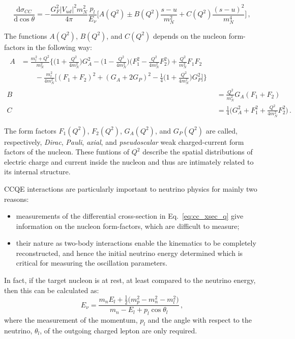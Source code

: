  \begin{equation}
   \label{eq:cc_xsec_t}
   \frac{\mathrm{d} \sigma_{CC}}{\mathrm{d}\cos\theta} = -\frac{G_F^2 |V_{ud}|^2 m_N^2}{4\pi} \frac{p_l}{E_\nu} %
   \bigg [A(Q^2) \pm B(Q^2) \frac{s-u}{m_N^2} + C(Q^2) \frac{(s-u)^2}{m_N^4} \bigg]\,,
 \end{equation}

 The functions $A(Q^2)$, $B(Q^2)$, and $C(Q^2)$ depends on the nucleon form-factors in the following way:
 \begin{align}
   \begin{split}
     \label{eq:A(Q)}
     A &= \frac{m_l^2+Q^2}{m_N^2} \bigg\{ \bigg(1+\frac{Q^2}{4m_N^2}\bigg) G_A^2 - \bigg(1-\frac{Q^2}{4m_N^2}\bigg) %
     \bigg(F_1^2 - \frac{Q^2}{4m_N^2}F_2^2 \bigg) +\frac{Q^2}{m_N^2} F_1 F_2 \\
       &\qquad- \frac{m_l^2}{4m_N^2} %
     \bigg[ (F_1+F_2)^2+(G_A+2G_P)^2-\frac{1}{4}\bigg(1+\frac{Q^2}{4m_N^2}\bigg) G_P^2 \bigg] \bigg\}\, 
   \end{split}\\
     \label{eq:B(Q)}
   B &= \frac{Q^2}{m_N^2} G_A (F_1+F_2)\,\\
     \label{eq:C(Q)}
   C &= \frac{1}{4} \big (G_A^2 +F_1^2+\frac{Q^2}{4m_N^2}F_2^2\big)\,.
 \end{align}

 The form factors $F_1(Q^2)$, $F_2(Q^2)$, $G_A(Q^2)$, and $G_P(Q^2)$ are called, respectively, \emph{Dirac}, %
 \emph{Pauli}, \emph{axial}, and \emph{pseudoscalar} weak charged-current form factors of the nucleon.
 These funtions of $Q^2$ describe the spatial distributions of electric charge and current inside the nucleon %
 and thus are intimately related to its internal structure.

 CCQE interactions are particularly important to neutrino physics for mainly two reasons:
 \begin{itemize}
   \item measurements of the differential cross-section in Eq.~\ref{eq:cc_xsec_q} give information on the %
     nucleon form-factors, which are difficult to measure; 
   \item their nature as two-body interactions enable the kinematics to be completely reconstructed, %
     and hence the initial neutrino energy determined which is critical for measuring the oscillation parameters.
 \end{itemize}

 In fact, if the target nucleon is at rest, at least compared to the neutrino energy, %
 then this can be calculated as:
 \begin{equation}
   E_\nu = \frac{m_n E_l + \frac{1}{2}\big ( m_p^2-m_n^2-m_l^2)}{m_n - E_l+p_l \cos \theta_l}\,,
 \end{equation}
 where the measurement of the momentum, $p_l$ and the angle with respect to the neutrino, $\theta_l$, of the %
 outgoing charged lepton are only required.


